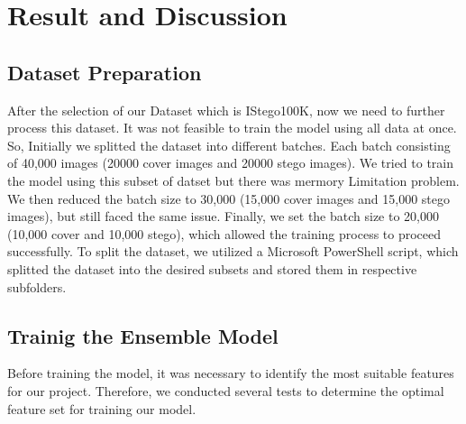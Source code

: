 \chapter{Result and Discussion}
\section{Dataset Preparation}
After the selection of our Dataset which is IStego100K\cite{7}, now we need to further process this dataset. It was not feasible to train the model using all data at once. So, Initially we splitted the dataset into different batches. Each batch consisting of 40,000 images (20000 cover images and 20000 stego images). We tried to train the model using this subset of datset but there was mermory Limitation problem. We then reduced the batch size to 30,000 (15,000 cover images and 15,000 stego images), but still faced the same issue. Finally, we set the batch size to 20,000 (10,000 cover and 10,000 stego), which allowed the training process to proceed successfully. To split the dataset, we utilized a Microsoft PowerShell script, which splitted the dataset into the desired subsets and stored them in respective subfolders.\\
\section{Trainig the Ensemble Model}
Before training the model, it was necessary to identify the most suitable features for our project. Therefore, we conducted several tests to determine the optimal feature set for training our model.
